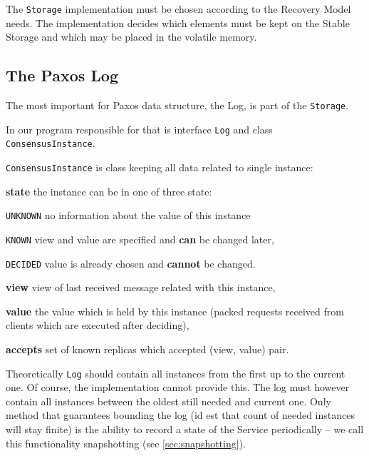\strut

The \texttt{Storage} implementation must be chosen according to the Recovery Model needs.
The implementation decides which elements must be kept on the Stable Storage and which may be placed in the volatile memory.

\subsection{The Paxos Log}
\label{subsec:the_paxos_log}
The most important for Paxos data structure, the Log, is part of the \texttt{Storage}.

In our program responsible for that is interface \texttt{Log} and class \texttt{Con\-sen\-susInstance}.

\texttt{ConsensusInstance} is class keeping all data related to single instance:
\begin{tightList}[\setlength{\itemindent}{0pt}\setlength{\leftmargin}{2\leftmargin}]
  \item[\textbf{state}] the instance can be in one of three state:
  \begin{tightList}[\setlength{\itemindent}{0pt} \setlength{\labelwidth}{7em}]
    \item[\texttt{\tiny UNKNOWN}] no information about the value of this instance
    \item[\texttt{\tiny KNOWN}] view and value are specified and \textbf{can} be changed later,
    \item[\texttt{\tiny DECIDED}] value is already chosen and \textbf{cannot} be changed.
  \end{tightList}
  \item[\textbf{view}] view of last received message related with this instance,
  \item[\textbf{value}] the value which is held by this instance (packed requests received from clients which are executed after deciding),
  \item[\textbf{accepts}] set of known replicas which accepted (view, value) pair.
\end{tightList}

Theoretically \texttt{Log} should contain all instances from the first up to the current one. Of course, the implementation cannot provide this. The log must however contain all instances between the oldest still needed and current one. Only method that guarantees bounding the log (id est that count of needed instances will stay finite) is the ability to record a state of the Service periodically -- we call this functionality snapshotting (see \ref{sec:snapshotting}).

